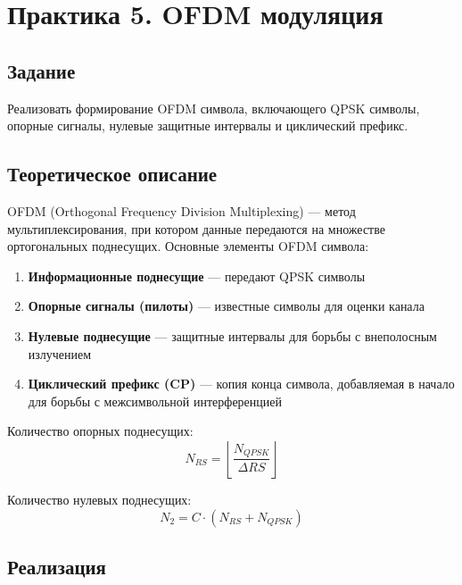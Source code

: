 \chapter{Практика 5. OFDM модуляция}

\section{Задание}
Реализовать формирование OFDM символа, включающего QPSK символы, опорные сигналы, нулевые защитные интервалы и циклический префикс.

\section{Теоретическое описание}
OFDM (Orthogonal Frequency Division Multiplexing) — метод мультиплексирования, при котором данные передаются на множестве ортогональных поднесущих. Основные элементы OFDM символа:

\begin{enumerate}
    \item \textbf{Информационные поднесущие} — передают QPSK символы
    \item \textbf{Опорные сигналы (пилоты)} — известные символы для оценки канала
    \item \textbf{Нулевые поднесущие} — защитные интервалы для борьбы с внеполосным излучением
    \item \textbf{Циклический префикс (CP)} — копия конца символа, добавляемая в начало для борьбы с межсимвольной интерференцией
\end{enumerate}

Количество опорных поднесущих:
\[
N_{RS} = \left\lfloor \frac{N_{QPSK}}{\Delta RS} \right\rfloor
\]

Количество нулевых поднесущих:
\[
N_2 = C \cdot (N_{RS} + N_{QPSK})
\]

\section{Реализация}

